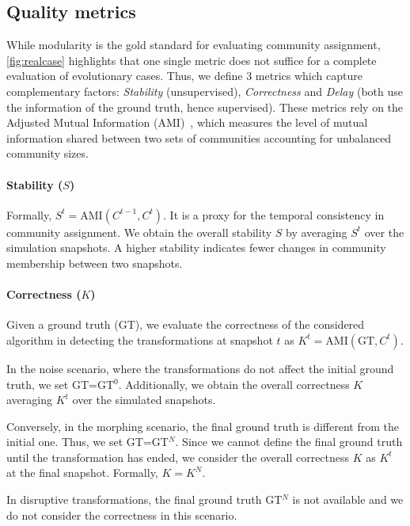 \documentclass[letterpaper]{article}
\begin{document}
\subsection{Quality metrics}
\label{ss:metrics}

While modularity is the gold standard for evaluating community assignment, \cref{fig:realcase} highlights that one single metric does not suffice for a complete evaluation of evolutionary cases. Thus, we define 3 metrics which capture complementary factors: \emph{Stability} (unsupervised), \emph{Correctness} and \emph{Delay} (both use the information of the ground truth, hence supervised). These metrics rely on the Adjusted Mutual Information (AMI)~\cite{vinh2009ami}, which measures the level of mutual information shared between two sets of communities accounting for unbalanced community sizes.

\paragraph*{Stability ($S$)}  Formally, {$S^t=\text{AMI}(C^{t-1},C^t)$}. It is a proxy for the temporal consistency in community assignment. We obtain the overall stability $S$ by averaging $S^t$ over the simulation snapshots. A higher stability indicates fewer changes in community membership between two snapshots.

\paragraph*{Correctness ($K$)} Given a ground truth (GT), we evaluate the correctness of the considered algorithm in detecting the transformations at snapshot $t$ as $K^t = \text{AMI}(\text{GT},C^t)$.

In the noise scenario, where the transformations do not affect the initial ground truth, we set GT=GT$^0$. Additionally, we obtain the overall correctness $K$ averaging $K^t$ over the simulated snapshots.

Conversely, in the morphing scenario, the final ground truth is different from the initial one. Thus, we set GT=GT$^N$. Since we cannot define the final ground truth until the transformation has ended, we consider the overall correctness $K$ as $K^t$ at the final snapshot. Formally, $K=K^N$.

In disruptive transformations, the final ground truth GT$^N$ is not available and we do not consider the correctness in this scenario.
\end{document}
